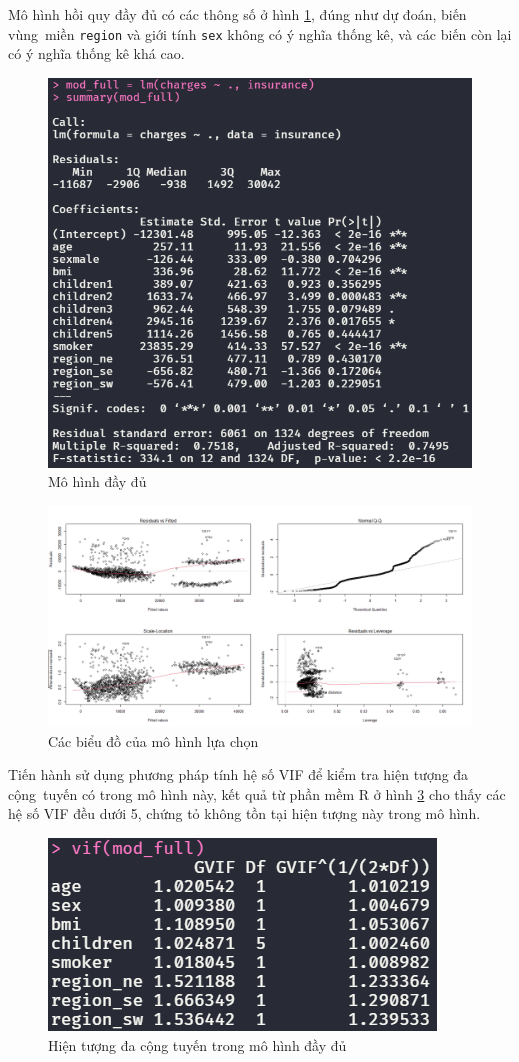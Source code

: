 Mô hình hồi quy đầy đủ có các thông số ở hình \ref{fig-a1:model-full}, đúng như dự đoán, biến vùng~miền \texttt{region} và giới tính \texttt{sex} không có ý nghĩa thống kê, và các biến còn lại có ý nghĩa thống kê khá cao.
\begin{figure}[H]
	\centering
	\includegraphics[width=0.7\linewidth]{images/A1/model-full}
	\caption{Mô hình đầy đủ}
	\label{fig-a1:model-full}
\end{figure}

\begin{figure}[H]
	\centering
	\includegraphics[width=0.8\linewidth]{images/A1/model-full-plot}
	\caption{Các biểu đồ của mô hình lựa chọn}
	\label{fig-a1:model-full-plot}
\end{figure}

Tiến hành sử dụng phương pháp tính hệ số VIF để kiểm tra hiện tượng đa cộng~tuyến có trong mô hình này, kết quả từ phần mềm R ở hình \ref{fig-a1:model-full-vif} cho thấy các hệ số VIF đều dưới 5, chứng tỏ không tồn tại hiện tượng này trong mô hình.
\begin{figure}[H]
	\centering
	\includegraphics[width=0.5\linewidth]{images/A1/model-full-vif}
	\caption{Hiện tượng đa cộng tuyến trong mô hình đầy đủ}
	\label{fig-a1:model-full-vif}
\end{figure}

